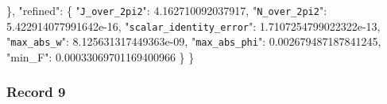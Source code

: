 \documentclass[
  10pt,
]{article}
\newenvironment{Shaded}{}{}
\newcommand{\DataTypeTok}[1]{\textcolor[rgb]{0.56,0.13,0.00}{#1}}
\newcommand{\FloatTok}[1]{\textcolor[rgb]{0.25,0.63,0.44}{#1}}
\newcommand{\FunctionTok}[1]{\textcolor[rgb]{0.02,0.16,0.49}{#1}}
\begin{document}
\begin{Shaded}
\begin{Highlighting}[]
  \FunctionTok{\},}
  \DataTypeTok{"refined"}\FunctionTok{:} \FunctionTok{\{}
    \DataTypeTok{"\nolinkurl{J_over_2pi2}"}\FunctionTok{:} \FloatTok{4.162710092037917}\FunctionTok{,}
    \DataTypeTok{"\nolinkurl{N_over_2pi2}"}\FunctionTok{:} \FloatTok{5.422914077991642e{-}16}\FunctionTok{,}
    \DataTypeTok{"\nolinkurl{scalar_identity_error}"}\FunctionTok{:} \FloatTok{1.7107254799022322e{-}13}\FunctionTok{,}
    \DataTypeTok{"\nolinkurl{max_abs_w}"}\FunctionTok{:} \FloatTok{8.125631317449363e{-}09}\FunctionTok{,}
    \DataTypeTok{"\nolinkurl{max_abs_phi}"}\FunctionTok{:} \FloatTok{0.002679487187841245}\FunctionTok{,}
    \DataTypeTok{"min\_F"}\FunctionTok{:} \FloatTok{0.00033069701169400966}
  \FunctionTok{\}}
\FunctionTok{\}}
\end{Highlighting}
\end{Shaded}

\hypertarget{record-9}{%
\subsubsection{Record 9}\label{record-9}}
\end{document}
